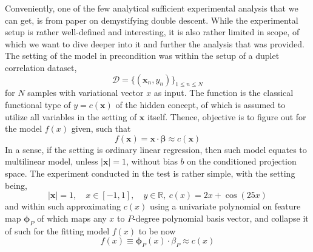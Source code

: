 Conveniently, one of the few analytical sufficient experimental analysis that we can get, is from \cite{schaeffer_double_2023} paper on demystifying double descent. While the experimental setup is rather well-defined and interesting, it is also rather limited in scope, of which we want to dive deeper into it and further the analysis that was provided. The setting of the model in precondition was within the setup of a duplet correlation dataset, 
\begin{equation}
    \mathcal{D} = \{(\mathbf{x}_{n}, y_{n})\}_{1\leq n \leq N}
\end{equation}
for $N$ samples with variational vector $x$ as input. The function is the classical functional type of $y=c(\mathbf{x})$ of the hidden concept, of which is assumed to utilize all variables in the setting of $\mathbf{x}$ itself. Thence, objective is to figure out for the model $f(x)$ given, such that
\begin{equation}
    f(\mathbf{x}) = \mathbf{x}\cdot \bm{\beta} \approx c(\mathbf{x}) 
\end{equation}
In a sense, if the setting is ordinary linear regression, then such model equates to multilinear model, unless $|\mathbf{x}|=1$, without bias $b$ on the conditioned projection space. The experiment conducted in the test is rather simple, with the setting being,
\begin{equation}
    |\mathbf{x}| = 1,\quad x\in [-1,1],\quad y\in \mathbb{R},\: c(x) = 2x + \cos{(25x)}
\end{equation}
and within such approximating $c(x)$ using a univariate polynomial on feature map $\bm{\phi}_{P}$ of which maps any $x$ to $P$-degree polynomial basis vector, and collapse it of such for the fitting model $f(x)$ to be now
\begin{equation}
    f(x)\equiv \bm{\phi}_{P}(x)\cdot \beta_{P} \approx c(x)
\end{equation}

